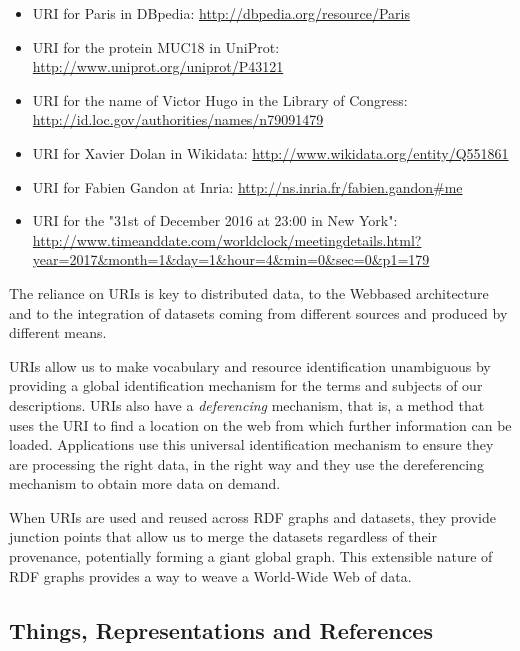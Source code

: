 \begin{itemize}
\item
  URI for Paris in DBpedia: \url{http://dbpedia.org/resource/Paris}
\item
  URI for the protein MUC18 in UniProt:
  \url{http://www.uniprot.org/uniprot/P43121}
\item
  URI for the name of Victor Hugo in the Library of Congress:
  \url{http://id.loc.gov/authorities/names/n79091479}
\item
  URI for Xavier Dolan in Wikidata:
  \url{http://www.wikidata.org/entity/Q551861}
\item
  URI for Fabien Gandon at Inria:
  \url{http://ns.inria.fr/fabien.gandon\#me}
\item
  URI for the "31st of December 2016 at 23:00 in New York":
  \url{http://www.timeanddate.com/worldclock/meetingdetails.html?year=2017\&month=1\&day=1\&hour=4\&min=0\&sec=0\&p1=179}
\end{itemize}

The reliance on URIs is key to distributed data, to the Web\-based
architecture and to the integration of datasets coming from different
sources and produced by different means.

URIs  allow us to make  vocabulary and  resource
identification unambiguous by providing a global identification
mechanism for the terms and subjects of our descriptions. URIs also have a 
\emph{deferencing} mechanism, that is, a method that uses the URI to find a location 
on the web from which further information can be loaded. 
Applications use this universal
identification mechanism to ensure they are processing the right data,
in the right way and they use the dereferencing mechanism to obtain more
data on demand.

When URIs are used and reused across RDF graphs and datasets, they
provide junction points that allow us to merge the datasets regardless
of their provenance, potentially forming a  giant global graph. This
extensible nature of RDF graphs provides a way to weave a World-Wide Web
of data.

\subsection{Things, Representations and References}

